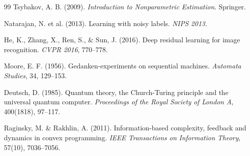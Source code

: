 \begin{thebibliography}{99}
Tsybakov, A. B. (2009).
\emph{Introduction to Nonparametric Estimation}. Springer.

Natarajan, N. et al. (2013).
Learning with noisy labels.
\emph{NIPS 2013}.

He, K., Zhang, X., Ren, S., \& Sun, J. (2016).
Deep residual learning for image recognition.
\emph{CVPR 2016}, 770--778.

Moore, E. F. (1956).
Gedanken-experiments on sequential machines.
\emph{Automata Studies}, 34, 129--153.

Deutsch, D. (1985).
Quantum theory, the Church-Turing principle and the universal quantum computer.
\emph{Proceedings of the Royal Society of London A}, 400(1818), 97--117.

Raginsky, M. \& Rakhlin, A. (2011).
Information-based complexity, feedback and dynamics in convex programming.
\emph{IEEE Transactions on Information Theory}, 57(10), 7036--7056.

\end{thebibliography}


